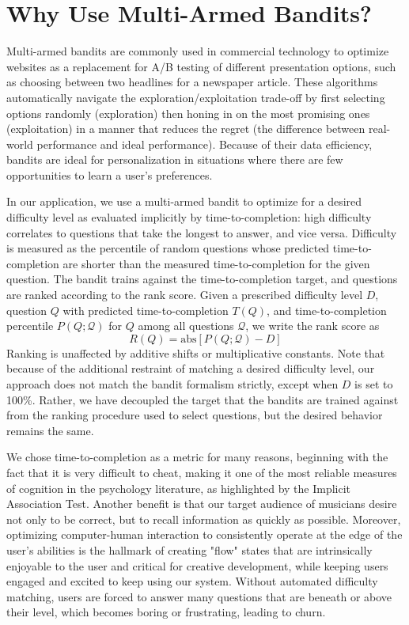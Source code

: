 \documentclass[manuscript, nonacm]{acmart_no_footer}
\begin{document}
\section{Why Use Multi-Armed Bandits?}

Multi-armed bandits are commonly used in commercial technology to optimize websites\cite{bandit_website_optimization} as a replacement for A/B testing of different presentation options, such as choosing between two headlines for a newspaper article\cite{new_york_times_headlines}. These algorithms automatically navigate the exploration/exploitation trade-off by first selecting options randomly (exploration) then honing in on the most promising ones (exploitation) in a manner that reduces the regret (the difference between real-world performance and ideal performance). Because of their data efficiency, bandits are ideal for personalization in situations where there are few opportunities to learn a user's preferences.

In our application, we use a multi-armed bandit to optimize for a desired difficulty level as evaluated implicitly by time-to-completion: high difficulty correlates to questions that take the longest to answer, and vice versa. Difficulty is measured as the percentile of random questions whose predicted time-to-completion are shorter than the measured time-to-completion for the given question. The bandit trains against the time-to-completion target, and questions are ranked according to the rank score. Given a prescribed difficulty level $D$, question $Q$ with predicted time-to-completion $T(Q)$, and time-to-completion percentile $P(Q;\mathcal{Q})$ for $Q$ among all questions $\mathcal{Q}$, we write the rank score as \begin{equation}\label{eq:rank_score}R(Q)=\text{abs}\left[P(Q;\mathcal{Q})-D\right]\end{equation}Ranking is unaffected by additive shifts or multiplicative constants. Note that because of the additional restraint of matching a desired difficulty level, our approach does not match the bandit formalism strictly, except when $D$ is set to 100\%. Rather, we have decoupled the target that the bandits are trained against from the ranking procedure used to select questions, but the desired behavior remains the same.

We chose time-to-completion as a metric for many reasons, beginning with the fact that it is very difficult to cheat, making it one of the most reliable measures of cognition in the psychology literature, as highlighted by the Implicit Association Test\cite{implicit_association_test}. Another benefit is that our target audience of musicians desire not only to be correct, but to recall information as quickly as possible. Moreover, optimizing computer-human interaction to consistently operate at the edge of the user's abilities is the hallmark of creating "flow" states that are intrinsically enjoyable to the user and critical for creative development\cite{flow}, while keeping users engaged and excited to keep using our system. Without automated difficulty matching, users are forced to answer many questions that are beneath or above their level, which becomes boring or frustrating, leading to churn.
\end{document}
